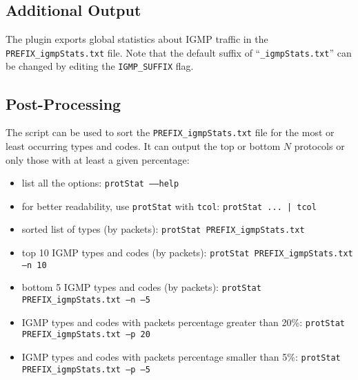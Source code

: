 \documentclass[documentation]{subfiles}
\begin{document}
\subsection{Additional Output}\label{igmpDecode:additonalOutput}
The plugin exports global statistics about IGMP traffic in the {\tt PREFIX\_igmpStats.txt} file.
Note that the default suffix of ``{\tt \_igmpStats.txt}'' can be changed  by editing the {\tt IGMP\_SUFFIX} flag.

\subsection{Post-Processing}
The {\tt{}} script can be used to sort the {\tt PREFIX\_igmpStats.txt} file for the most or least occurring types and codes.
It can output the top or bottom $N$ protocols or only those with at least a given percentage:
\begin{itemize}
    \item list all the options: {\tt protStat --{}--help}
    \item for better readability, use {\tt protStat} with {\tt tcol}: {\tt protStat ... | tcol}
    \item sorted list of types (by packets): {\tt protStat PREFIX\_igmpStats.txt}
    \item top 10 IGMP types and codes (by packets): {\tt protStat PREFIX\_igmpStats.txt --n 10}
    \item bottom 5 IGMP types and codes (by packets): {\tt protStat PREFIX\_igmpStats.txt --n --5}
    \item IGMP types and codes with packets percentage greater than 20\%: {\tt protStat PREFIX\_igmpStats.txt --p 20}
    \item IGMP types and codes with packets percentage smaller than 5\%: {\tt protStat PREFIX\_igmpStats.txt --p --5}
\end{itemize}
\end{document}
